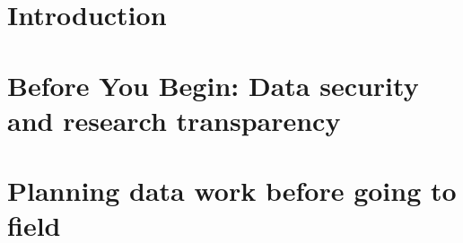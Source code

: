 %
%
%
%




\cleardoublepage
\chapter*{Introduction} %




\chapter{Before You Begin: Data security and research transparency}
\label{ch:1}




\chapter{Planning data work before going to field}
\label{ch:2}




